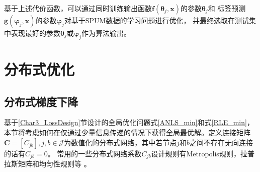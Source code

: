 基于上述代价函数，可以通过同时训练输出函数$\boldsymbol f\left(\boldsymbol\theta_j,\boldsymbol x\right)$的参数$\boldsymbol\theta_j$和
标签预测$\boldsymbol g\left(\boldsymbol\varphi_j,\boldsymbol x\right)$的参数$\boldsymbol\varphi_j$对基于SPUM数据的学习问题进行优化，
并最终选取在测试集中表现最好的参数$\boldsymbol \theta_j$或$\boldsymbol\varphi_j$作为算法输出。

\section{分布式优化}\label{Char3_Distributed}
\subsection{分布式梯度下降}\label{Char3_DGD}
{基于\ref{Char3_LossDesign}节设计的全局优化问题式\eqref{ANLS_min}和式\eqref{RLE_min}，本节将考虑如何在仅通过少量信息传递的情况下获得全局最优解。定义连接矩阵$\boldsymbol C=[C_{jb}],j,b\in\mathcal{J}$为数值化的分布式网络，}其中若节点$j$和$b$之间不存在无向连接的话有$C_{jb}=0$。
常用的一些分布式网络系数$C_{jb}$设计规则有Metropolis规则，拉普拉斯矩阵和均匀性规则等
\cite{Fang_Metropolis_2010, Olfati_Laplas_2004, Kang_Uniform_2021}。

